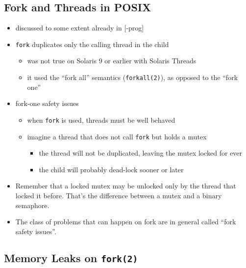 
\subsection{Fork and Threads in POSIX}

\begin{itemize}
\item discussed to some extent already in [\myun\myix-prog]
\item \texttt{fork} duplicates only the calling thread in the child
	\begin{itemize}
	\item was not true on Solaris 9 or earlier with Solaris Threads
	\item it used the ``fork all'' semantics (\texttt{forkall(2)}), as
	opposed to the ``fork one''
	\end{itemize}
\item fork-one safety issues
	\begin{itemize}
	\item when \texttt{fork} is used, threads must be well behaved
	\item imagine a thread that does not call \texttt{fork} but holds a
	mutex
		\begin{itemize}
		\item the thread will not be duplicated, leaving the mutex
		locked for ever
		\item the child will probably dead-lock sooner or later
		\end{itemize}
	\end{itemize}
\end{itemize}

\begin{itemize}
\item Remember that a locked mutex may be unlocked only by the thread that
locked it before. That's the difference between a mutex and a binary
se\-ma\-pho\-re.
\item The class of problems that can happen on fork are in general called ``fork
safety issues''.
\end{itemize}


\subsection{Memory Leaks on \texttt{fork(2)}}

